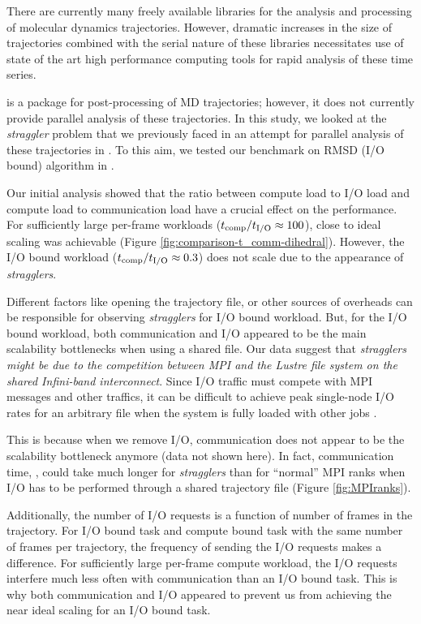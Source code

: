 \label{concl} 
There are currently many freely available libraries for the analysis and processing of molecular dynamics trajectories.
However, dramatic increases in the size of trajectories combined with the serial nature of these libraries necessitates 
use of state of the art high performance computing tools for rapid analysis of these time series. 

 is a package for post-processing of MD trajectories; however, it does not currently provide parallel analysis of these trajectories.
In this study, we looked at the \emph{straggler} problem that we previously faced in an attempt for parallel analysis of these trajectories in  \cite{Khoshlessan:2017ab}.
To this aim, we tested our benchmark on RMSD (I/O bound) algorithm in .

Our initial analysis showed that the ratio between compute load to I/O load and compute load to communication load have a crucial effect on the performance. 
For sufficiently large per-frame workloads (${t}_{\text{comp}}/{t}_{\text{I/O}} \approx 100$), close to ideal scaling was achievable (Figure \ref{fig:comparison-t_comm-dihedral}).
However, the I/O bound workload (${t}_{\text{comp}}/{t}_{\text{I/O}} \approx 0.3$) does not scale due to the appearance of \emph{stragglers}. 

Different factors like opening the trajectory file, or other sources of overheads can be responsible for observing \emph{stragglers} for I/O bound workload.
But, for the I/O bound workload, both communication and I/O appeared to be the main scalability bottlenecks when using a shared file.
Our data suggest that \emph{stragglers might be due to the competition between MPI and the Lustre file system on the shared Infini-band interconnect}.  
Since I/O traffic must compete with MPI messages and other traffics, it can be difficult to achieve peak single-node I/O rates for an arbitrary file when the system is fully loaded with other jobs \cite{VMD2013, Kevin2018}. 

This is because when we remove I/O, communication does not appear to be the scalability bottleneck anymore (data not shown here).
In fact, communication time, \tcomm, could take
much longer for \emph{stragglers} than for ``normal'' MPI ranks when I/O has to be performed through a shared trajectory file (Figure \ref{fig:MPIranks}). 

Additionally, the number of I/O requests is a function of number of frames in the trajectory. 
For I/O bound task and compute bound task with the same number of frames per trajectory, the frequency of sending the I/O requests makes a difference.
For sufficiently large per-frame compute workload, the I/O requests interfere much less often with communication than an I/O bound task.
This is why both communication and I/O appeared to prevent us from achieving the near ideal scaling for an I/O bound task.


